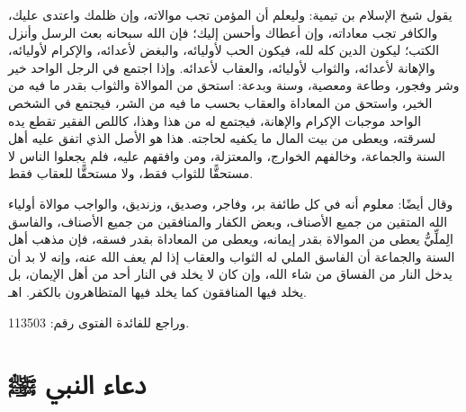 يقول شيخ الإسلام بن تيمية: وليعلم أن المؤمن تجب موالاته، وإن ظلمك واعتدى عليك، والكافر تجب معاداته، وإن أعطاك وأحسن إليك؛ فإن الله سبحانه بعث الرسل وأنزل الكتب؛ ليكون الدين كله لله، فيكون الحب لأوليائه، والبغض لأعدائه، والإكرام لأوليائه، والإهانة لأعدائه، والثواب لأوليائه، والعقاب لأعدائه. وإذا اجتمع في الرجل الواحد خير وشر وفجور، وطاعة ومعصية، وسنة وبدعة: استحق من الموالاة والثواب بقدر ما فيه من الخير، واستحق من المعاداة والعقاب بحسب ما فيه من الشر، فيجتمع في الشخص الواحد موجبات الإكرام والإهانة، فيجتمع له من هذا وهذا، كاللص الفقير تقطع يده لسرقته، ويعطى من بيت المال ما يكفيه لحاجته. هذا هو الأصل الذي اتفق عليه أهل السنة والجماعة، وخالفهم الخوارج، والمعتزلة، ومن وافقهم عليه، فلم يجعلوا الناس لا مستحقًّا للثواب فقط، ولا مستحقًّا للعقاب فقط. 

وقال أيضًا: معلوم أنه في كل طائفة بر، وفاجر، وصديق، وزنديق، والواجب موالاة أولياء الله المتقين من جميع الأصناف، وبعض الكفار والمنافقين من جميع الأصناف، والفاسق الِملِّيُّ يعطى من الموالاة بقدر إيمانه، ويعطى من المعاداة بقدر فسقه، فإن مذهب أهل السنة والجماعة أن الفاسق الملي له الثواب والعقاب إذا لم يعف الله عنه، وإنه لا بد أن يدخل النار من الفساق من شاء الله، وإن كان لا يخلد في النار أحد من أهل الإيمان، بل يخلد فيها المنافقون كما يخلد فيها المتظاهرون بالكفر. اهـ.

وراجع للفائدة الفتوى رقم: 113503.


\section{دعاء النبي ﷺ}


